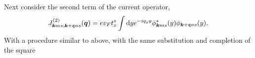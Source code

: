 Next consider the second term of the current operator,
\begin{equation}
  \label{eq:103}
  J_{\bm{k} m s; \bm{k} + \mathfrak{q} n s}^{(2)} (\bm{q}) =
  e v_{F} t^s_{x}
  \int \mathrm{d} y
  e^{-iq_{y} y}
  \phi ^{*}_{\bm{k} m s}(y)  \phi _{\bm{k} + \mathfrak{q} n s}(y).
\end{equation}
With a procedure similar to above, with the same substitution and completion of the square
